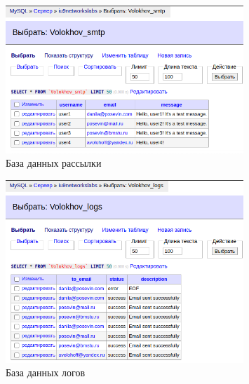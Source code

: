 \documentclass[a4paper, 14pt]{extarticle}
\begin{document}
\begin{figure}[!htb]
	\centering
	\includegraphics[width=0.8\textwidth]{res3.png}
\caption{База данных рассылки}
\label{fig:img3}
\end{figure}

\begin{figure}[!htb]
	\centering
	\includegraphics[width=0.8\textwidth]{res4.png}
\caption{База данных логов}
\label{fig:img3}
\end{figure}
\end{document}
